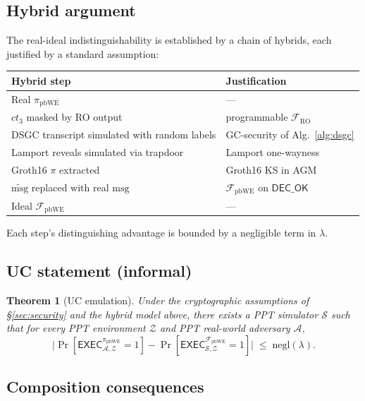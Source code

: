 \documentclass[11pt]{article}
\newtheorem{theorem}{Theorem}
\newcommand{\msg}{\mathrm{msg}}
\newcommand{\negl}{\mathrm{negl}}
\begin{document}
\subsection{Hybrid argument}

The real-ideal indistinguishability is established by a chain of
hybrids, each justified by a standard assumption:

\begin{center}\small
\renewcommand{\arraystretch}{1.15}
\begin{tabular}{@{}l l@{}}
\toprule
\textbf{Hybrid step} & \textbf{Justification} \\
\midrule
Real $\pi_{\mathrm{pbWE}}$ & --- \\
$ct_3$ masked by RO output & programmable $\mathcal{F}_{\mathrm{RO}}$ \\
DSGC transcript simulated with random labels & GC-security of Alg.~\ref{alg:dsgc} \\
Lamport reveals simulated via trapdoor & Lamport one-wayness \\
Groth16 $\pi$ extracted & Groth16 KS in AGM \\
$\widetilde{\msg}$ replaced with real $\msg$ & $\mathcal{F}_{\mathrm{pbWE}}$ on $\mathsf{DEC\_OK}$ \\
Ideal $\mathcal{F}_{\mathrm{pbWE}}$ & --- \\
\bottomrule
\end{tabular}
\end{center}

Each step's distinguishing advantage is bounded by a negligible
term in $\lambda$.

\subsection{UC statement (informal)}

\begin{theorem}[UC emulation]\label{thm:uc}
Under the cryptographic assumptions of \S\ref{sec:security} and the
hybrid model above, there exists a PPT simulator $\mathcal{S}$ such
that for every PPT environment $\mathcal{Z}$ and PPT real-world
adversary $\mathcal{A}$,
\[
  \bigl|\Pr[\mathsf{EXEC}^{\pi_{\mathrm{pbWE}}}_{\mathcal{A}, \mathcal{Z}} = 1]
       - \Pr[\mathsf{EXEC}^{\mathcal{F}_{\mathrm{pbWE}}}_{\mathcal{S}, \mathcal{Z}} = 1]\bigr|
  \;\leq\; \negl(\lambda).
\]
\end{theorem}

\subsection{Composition consequences}
\end{document}
